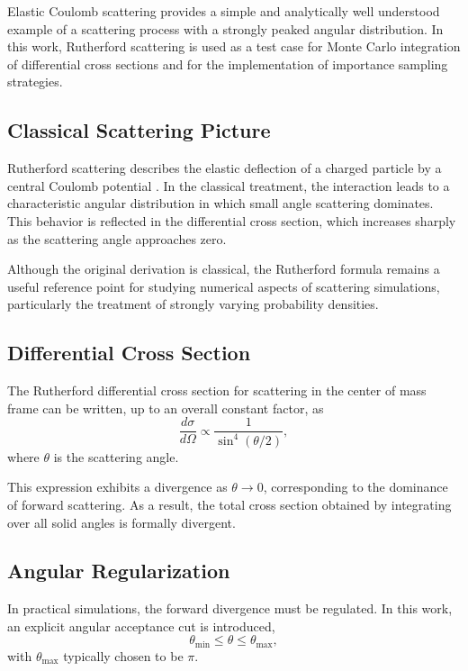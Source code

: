 \documentclass[11pt,a4paper]{article}
\begin{document}
Elastic Coulomb scattering provides a simple and analytically well understood example
of a scattering process with a strongly peaked angular distribution. In this work,
Rutherford scattering is used as a test case for Monte Carlo integration of differential
cross sections and for the implementation of importance sampling strategies.

\subsection{Classical Scattering Picture}

Rutherford scattering describes the elastic deflection of a charged particle by a
central Coulomb potential \cite{rutherford1911}. In the classical treatment, the interaction leads to a
characteristic angular distribution in which small angle scattering dominates.
This behavior is reflected in the differential cross section, which increases sharply
as the scattering angle approaches zero.

Although the original derivation is classical, the Rutherford formula remains a useful
reference point for studying numerical aspects of scattering simulations, particularly
the treatment of strongly varying probability densities.

\subsection{Differential Cross Section}

The Rutherford differential cross section for scattering in the center of mass frame
can be written, up to an overall constant factor, as
\begin{equation}
\frac{d\sigma}{d\Omega} \propto \frac{1}{\sin^4(\theta / 2)} ,
\end{equation}
where $\theta$ is the scattering angle.

This expression exhibits a divergence as $\theta \rightarrow 0$, corresponding to the
dominance of forward scattering. As a result, the total cross section obtained by
integrating over all solid angles is formally divergent.

\subsection{Angular Regularization}

In practical simulations, the forward divergence must be regulated. In this work, an
explicit angular acceptance cut is introduced,
\begin{equation}
\theta_{\min} \le \theta \le \theta_{\max},
\end{equation}
with $\theta_{\max}$ typically chosen to be $\pi$.
\end{document}
